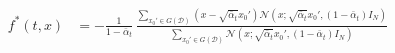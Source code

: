 \documentclass[a4paper,10pt]{article}
\theoremstyle{definition} %
\newtheorem{definition}{Definition}[section]
\theoremstyle{definition} %
\theoremstyle{definition} %
\newtheorem{theorem}[definition]{Theorem}
\theoremstyle{definition} %
\newcommand{\R}{\mathbb{R}}
\newcommand{\0}{\boldsymbol{0}}
\begin{document}
\begin{align*}
        f^*(t,x) &= -\frac{1}{1-\bar \alpha_t}  \,\frac{\sum\limits_{x_0' \in G(\mathcal{D})} (x - \sqrt{\bar \alpha_t} x_0') \mathcal{N}(x;\sqrt{\bar \alpha_t} x_0', (1-\bar \alpha_t) I_N) }{ \sum\limits_{x_0'\in G(\mathcal{D})} \mathcal{N}(x;\sqrt{\bar \alpha_t} x_0', (1-\bar \alpha_t) I_N)}
\end{align*}
\end{document}
